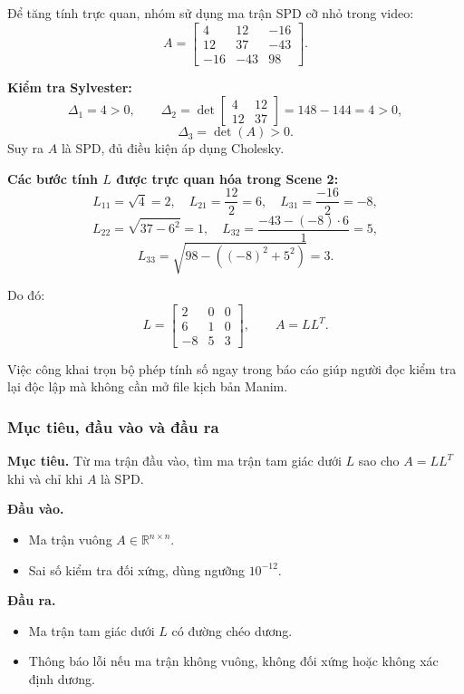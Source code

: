 \documentclass[a4paper]{article}
\begin{document}
Để tăng tính trực quan, nhóm sử dụng ma trận SPD cỡ nhỏ trong video:
\[
A=\begin{bmatrix}
4 & 12 & -16\\
12 & 37 & -43\\
-16 & -43 & 98
\end{bmatrix}.
\]

\textbf{Kiểm tra Sylvester:}
\[
\Delta_1=4>0,\qquad
\Delta_2=\det\begin{bmatrix}4&12\\12&37\end{bmatrix}=148-144=4>0,
\]
\[
\Delta_3=\det(A)>0.
\]
Suy ra $A$ là SPD, đủ điều kiện áp dụng Cholesky.

\textbf{Các bước tính $L$ được trực quan hóa trong Scene 2:}
\[
L_{11}=\sqrt{4}=2,\quad L_{21}=\frac{12}{2}=6,\quad L_{31}=\frac{-16}{2}=-8,
\]
\[
L_{22}=\sqrt{37-6^2}=1,\quad L_{32}=\frac{-43-(-8)\cdot6}{1}=5,
\]
\[
L_{33}=\sqrt{98-((-8)^2+5^2)}=3.
\]

Do đó:
\[
L=\begin{bmatrix}
2 & 0 & 0\\
6 & 1 & 0\\
-8 & 5 & 3
\end{bmatrix},
\qquad
A=LL^T.
\]

Việc công khai trọn bộ phép tính số ngay trong báo cáo giúp người đọc kiểm tra lại độc lập mà không cần mở file kịch bản Manim.

\subsubsection{Mục tiêu, đầu vào và đầu ra}

\textbf{Mục tiêu.} Từ ma trận đầu vào, tìm ma trận tam giác dưới $L$ sao cho $A = LL^T$ khi và chỉ khi $A$ là SPD.

\textbf{Đầu vào.}
\begin{itemize}
    \item Ma trận vuông $A \in \mathbb{R}^{n \times n}$.
    \item Sai số kiểm tra đối xứng, dùng ngưỡng $10^{-12}$.
\end{itemize}

\textbf{Đầu ra.}
\begin{itemize}
    \item Ma trận tam giác dưới $L$ có đường chéo dương.
    \item Thông báo lỗi nếu ma trận không vuông, không đối xứng hoặc không xác định dương.
\end{itemize}
\end{document}
